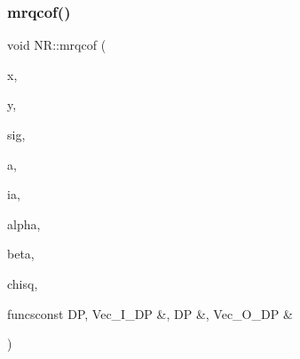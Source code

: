 \mbox{\label{namespaceNR_a03017a1caf19642fa6477f96dd20dbb3}} 
\subsubsection{\texorpdfstring{mrqcof()}{mrqcof()}}
{\footnotesize\ttfamily void N\+R\+::mrqcof (\begin{DoxyParamCaption}\item[{\mbox{\hyperlink{namespaceNR_a9f943da53862537c552e2a770cb170ae}{Vec\+\_\+\+I\+\_\+\+DP}} \&}]{x,  }\item[{\mbox{\hyperlink{namespaceNR_a9f943da53862537c552e2a770cb170ae}{Vec\+\_\+\+I\+\_\+\+DP}} \&}]{y,  }\item[{\mbox{\hyperlink{namespaceNR_a9f943da53862537c552e2a770cb170ae}{Vec\+\_\+\+I\+\_\+\+DP}} \&}]{sig,  }\item[{\mbox{\hyperlink{namespaceNR_a9f943da53862537c552e2a770cb170ae}{Vec\+\_\+\+I\+\_\+\+DP}} \&}]{a,  }\item[{\mbox{\hyperlink{namespaceNR_a70331f3de2cf735819b5719e4048d7f3}{Vec\+\_\+\+I\+\_\+\+B\+O\+OL}} \&}]{ia,  }\item[{\mbox{\hyperlink{namespaceNR_adc1f8da33094b6bbeb1f5f899515ce54}{Mat\+\_\+\+O\+\_\+\+DP}} \&}]{alpha,  }\item[{\mbox{\hyperlink{namespaceNR_a970094d23441f8ef6a45282a7eb2103d}{Vec\+\_\+\+O\+\_\+\+DP}} \&}]{beta,  }\item[{\mbox{\hyperlink{namespaceNR_af6ff762dd605ff477b8e52387253a02a}{DP}} \&}]{chisq,  }\item[{void }]{funcsconst D\+P, Vec\+\_\+\+I\+\_\+\+D\+P \&, D\+P \&, Vec\+\_\+\+O\+\_\+\+D\+P \& }\end{DoxyParamCaption})}

\mbox{\label{namespaceNR_a5e564c0d50dc1bbc161cbcee235b67bc}} 

